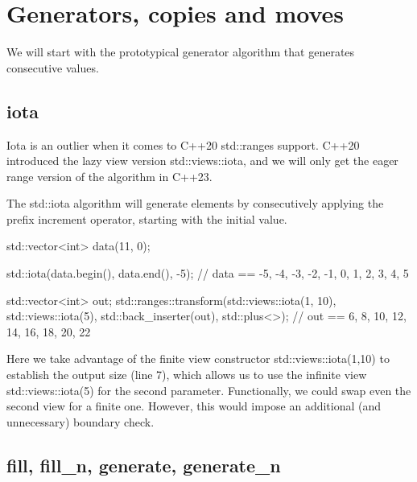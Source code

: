 \section{Generators, copies and moves}

We will start with the prototypical generator algorithm that generates consecutive values.

\subsection{iota}

Iota is an outlier when it comes to C++20 std::ranges support. C++20 introduced the lazy view version std::views::iota, and we will only get the eager range version of the algorithm in C++23.



The std::iota algorithm will generate elements by consecutively applying the prefix increment operator, starting with the initial value.

\begin{box-note}
\begin{cppcode}
std::vector<int> data(11, 0);

std::iota(data.begin(), data.end(), -5); 
// data == { -5, -4, -3, -2, -1, 0, 1, 2, 3, 4, 5 }

std::vector<int> out;
std::ranges::transform(std::views::iota(1, 10), std::views::iota(5), 
                       std::back_inserter(out), std::plus<>{});
// out == { 6, 8, 10, 12, 14, 16, 18, 20, 22 }
\end{cppcode}
\end{box-note}

Here we take advantage of the finite view constructor std::views::iota(1,10) to establish the output size (line 7), which allows us to use the infinite view std::views::iota(5) for the second parameter. Functionally, we could swap even the second view for a finite one. However, this would impose an additional (and unnecessary) boundary check.

\subsection{fill, fill\_n, generate, generate\_n}



